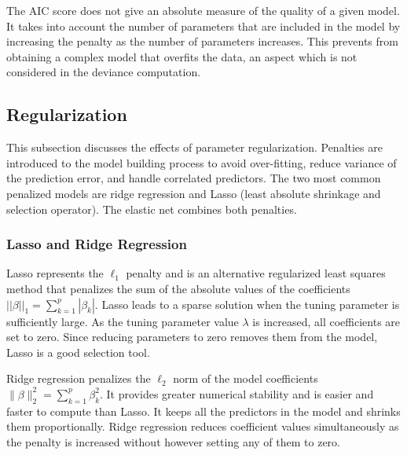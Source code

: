 The AIC score does not give an absolute measure of the quality of a given model. It takes into account the number of parameters that are included in the model by increasing the penalty as the number of parameters increases. This prevents from obtaining a complex model that overfits the data, an aspect which is not considered in the deviance computation.
 
%
%

\subsection{Regularization} \label{regularization}
This subsection discusses the effects of parameter regularization. Penalties are introduced to the model building process to avoid over-fitting, reduce variance of the prediction error, and handle correlated predictors. The two most common penalized models are ridge regression and Lasso (least absolute shrinkage and selection operator). The elastic net combines both penalties. 

\subsubsection{Lasso and Ridge Regression}

Lasso represents the $\ell_1$ penalty and is an alternative regularized least squares method that penalizes the sum of the absolute values of the coefficients 
$||\beta||_1=\sum_{k=1}^p |\beta_k|$. Lasso leads to a sparse solution when the tuning parameter is sufficiently large. As the tuning parameter value $\lambda$ is increased, all coefficients are set to zero. Since reducing
parameters to zero removes them from the model, Lasso is a good selection tool. 

Ridge regression penalizes the $\ell_2$ norm of the model coefficients $\| \beta \|_2^2=\sum_{k=1}^p \beta_k^2$. It provides greater numerical stability and is easier and faster to compute than Lasso. It keeps all the predictors in the model and shrinks them proportionally. Ridge regression reduces coefficient values simultaneously as the penalty is increased without however setting any of them to zero. 


